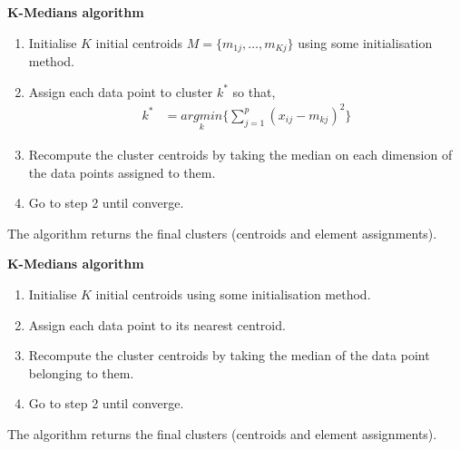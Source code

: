 \documentclass[12pt]{article}
\begin{document}
\begin{center}
	\begin{tcolorbox}[breakable,colback=white!100!white,colframe=black!100!black]
		\noindent\textbf{K-Medians algorithm}
		\begin{enumerate}
			\item Initialise $K$ initial centroids $M = \{m_{1j}, \dots, m_{Kj}\}$ using some initialisation method. 
			
			\item Assign each data point to cluster $k^*$ so that,
			\begin{align}\nonumber
			k^* &= \underset{k}{argmin}\bigg\{ \sum_{j=1}^{p} (x_{ij}-m_{kj})^2    \bigg\}
			\end{align}	
			
			\item Recompute the cluster centroids by taking the median on each dimension of the data points assigned to them.
			
			\item Go to step 2 until converge.		
			
		\end{enumerate}	
		The algorithm returns the final clusters (centroids and element assignments).
	\end{tcolorbox}
\end{center}

\begin{center}
	\begin{tcolorbox}[breakable,colback=white!100!white,colframe=black!100!black]
		\noindent\textbf{K-Medians algorithm}
		\begin{enumerate}
			\item Initialise $K$ initial centroids using some initialisation method. 
			
			\item Assign each data point to its nearest centroid. 
			
			\item Recompute the cluster centroids by taking the median of the data point belonging to them.
			
			\item Go to step 2 until converge.						
			
		\end{enumerate}	
		The algorithm returns the final clusters (centroids and element assignments).
	\end{tcolorbox}
\end{center}
	
\end{document}
